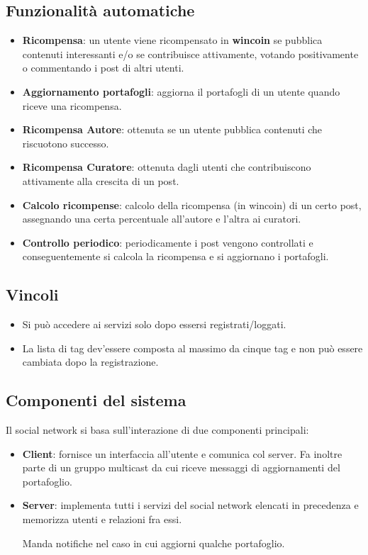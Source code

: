 \subsection{Funzionalit\`a automatiche}
\begin{itemize}
	\item \textbf{Ricompensa}: un utente viene ricompensato in \textbf{wincoin} se pubblica contenuti interessanti e/o se
	      contribuisce attivamente, votando positivamente o commentando i post di altri utenti.
	\item \textbf{Aggiornamento portafogli}: aggiorna il portafogli di un utente quando riceve una ricompensa.
	\item \textbf{Ricompensa Autore}: ottenuta se un utente pubblica contenuti che riscuotono successo.
	\item \textbf{Ricompensa Curatore}: ottenuta dagli utenti che contribuiscono attivamente alla crescita di un post.
	\item \textbf{Calcolo ricompense}: calcolo della ricompensa (in wincoin) di un certo post, assegnando una
	      certa percentuale all'autore e l'altra ai curatori.
	\item \textbf{Controllo periodico}: periodicamente i post vengono controllati e conseguentemente si calcola la ricompensa
	      e si aggiornano i portafogli.
\end{itemize}

\subsection{Vincoli}
\begin{itemize}
	\item Si pu\`o accedere ai servizi solo dopo essersi registrati/loggati.
	\item La lista di tag dev'essere composta al massimo da cinque tag e non pu\`o essere cambiata dopo la registrazione.
\end{itemize}

\subsection{Componenti del sistema}
Il social network si basa sull'interazione di due componenti principali:
\begin{itemize}
	\item \textbf{Client}: fornisce un interfaccia all'utente e comunica col server. Fa inoltre parte di un gruppo
	      multicast da cui riceve messaggi di aggiornamenti del portafoglio.
	\item \textbf{Server}: implementa tutti i servizi del social network elencati in precedenza e memorizza utenti e
	      relazioni fra essi.

	      Manda notifiche nel caso in cui aggiorni qualche portafoglio.
\end{itemize}